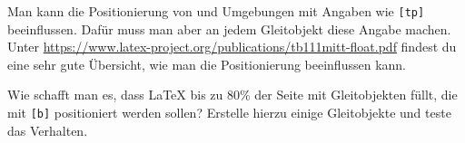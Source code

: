 \begin{uebung}
        \item Man kann die Positionierung von  und  Umgebungen mit
            Angaben wie \verb|[tp]| beeinflussen. Dafür muss man aber an jedem Gleitobjekt
            diese Angabe machen. Unter \url{https://www.latex-project.org/publications/tb111mitt-float.pdf}
            findest du eine sehr gute Übersicht, wie man die Positionierung beeinflussen kann.

            Wie schafft man es, dass \LaTeX{} bis zu 80\%{} der Seite mit Gleitobjekten füllt,
            die mit \verb|[b]| positioniert werden sollen?
            Erstelle hierzu einige Gleitobjekte und teste das Verhalten.
    \end{uebung}

